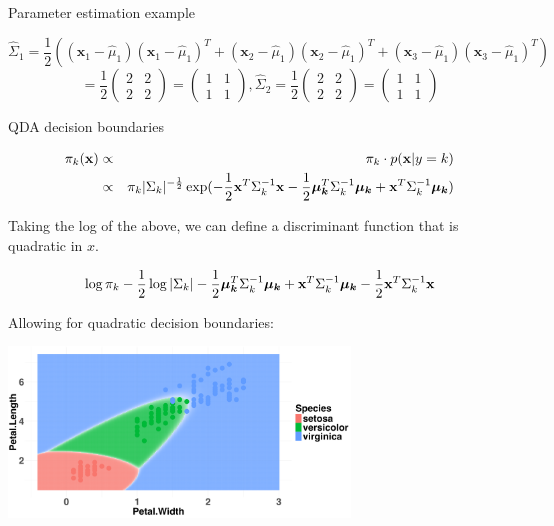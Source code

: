\documentclass[11pt,compress,t,notes=noshow, xcolor=table]{beamer}
\begin{document}
\begin{vbframe}{Parameter estimation example}
\begin{small}
\[
\hat{\Sigma}_1 = \frac{1}{2} \left( (\mathbf{x}_1 - \hat{\mu}_1)(\mathbf{x}_1 - \hat{\mu}_1)^T + (\mathbf{x}_2 - \hat{\mu}_1)(\mathbf{x}_2 - \hat{\mu}_1)^T + (\mathbf{x}_3 - \hat{\mu}_1)(\mathbf{x}_3 - \hat{\mu}_1)^T \right)
\]
\[
= \frac{1}{2} \begin{pmatrix} 2 & 2 \\ 2 & 2 \end{pmatrix} = \begin{pmatrix} 1 & 1 \\ 1 & 1 \end{pmatrix}, \hat{\Sigma}_2 = \frac{1}{2} \begin{pmatrix} 2 & 2 \\ 2 & 2 \end{pmatrix} = \begin{pmatrix} 1 & 1 \\ 1 & 1 \end{pmatrix}
\]
\end{small}
\end{vbframe}

\begin{vbframe}{QDA decision boundaries}

\vspace{-2em}
\begin{small}
\begin{eqnarray*}
\pi_{k}(\mathbf{x}) &\propto& \pi_{k} \cdot p(\mathbf{x} | y= k) \\
&\propto& \pi_{k} |\Sigma_k|^{-\frac{1}{2}}\exp(- \frac{1}{2} \mathbf{x}^T\Sigma_k^{-1}\mathbf{x} - \frac{1}{2} \bm{\mu_{k}}^T \Sigma_k^{-1} \bm{\mu_{k}} + \mathbf{x}^T \Sigma_k^{-1} \bm{\mu_{k}} )
\end{eqnarray*}

Taking the log of the above, we can define a discriminant function that is quadratic in $x$.

$$ \log \pi_{k} - \frac{1}{2} \log |\Sigma_k| - \frac{1}{2} \bm{\mu_{k}}^T \Sigma_k^{-1} \bm{\mu_{k}} + \mathbf{x}^T \Sigma_k^{-1} \bm{\mu_{k}} - \frac{1}{2} \mathbf{x}^T\Sigma_k^{-1}\mathbf{x} $$


Allowing for quadratic decision boundaries:

\vspace{-0.5em}
\begin{center}
\includegraphics[width=0.68\textwidth, clip=true, trim={0 0 0 20}]{figure/disc_db-qda.png}
\end{center}
\end{small}

\end{vbframe}
\end{document}
